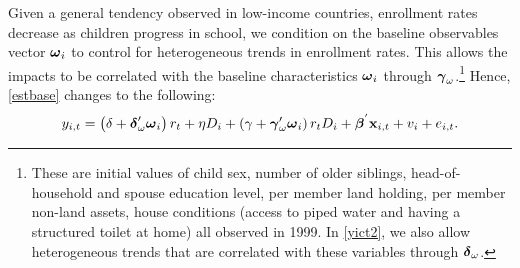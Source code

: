 \documentclass[12pt,letterpaper]{article}
\newcommand{\bfbeta}{\ensuremath{\mbox{\boldmath $\beta$}}}
\newcommand{\bfgamma}{\ensuremath{\mbox{\boldmath $\gamma$}}}
\newcommand{\bfdelta}{\ensuremath{\mbox{\boldmath $\delta$}}}
\newcommand{\bfomega}{\ensuremath{\mbox{\boldmath $\omega$}}}
\newcommand{\0}{\ensuremath{\mbox{\boldmath $0$}}}
\begin{document}

Given a general tendency observed in low-income countries, enrollment rates decrease as children progress in school, we condition on the baseline observables vector $\bfomega_{i}$ to control for heterogeneous trends in enrollment rates. This allows the impacts to be correlated with the baseline characteristics $\bfomega_{i}$ through $\bfgamma_{\omega}$.\footnote{These are initial values of child sex, number of older siblings, head-of-household and spouse education level, per member land holding, per member non-land assets, house conditions (access to piped water and having a structured toilet at home) all observed in 1999. In \eqref{yict2}, we also allow heterogeneous trends that are correlated with these variables through $\bfdelta_{\omega}$. }
Hence, \eqref{estbase} changes to the following:
\begin{equation}
y_{i,t} = 
\left(\delta +\bfdelta'_{\omega}\bfomega_{i}\right)r_{t} + \eta D_{i} +
\left(\gamma + \bfgamma'_{\omega}\bfomega_{i}\right)r_{t}D_{i} + 
\bfbeta^{'}\textbf{x}_{i,t} + v_{i} + e_{i,t}.
\label{yict2}
\end{equation}



\end{document}
